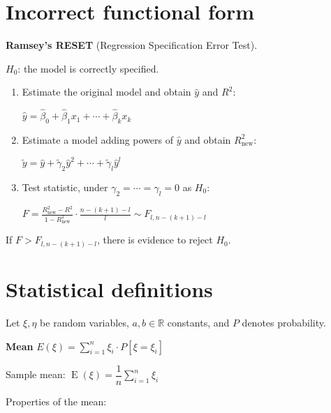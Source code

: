 \documentclass[10pt, a4paper, landscape]{article}
\DeclareMathOperator{\E}{E}
\begin{document}
\begin{multicols}{3}
\columnbreak

\section*{Incorrect functional form}

\textbf{Ramsey's RESET} (Regression Specification Error Test).

\begin{center}
	\( H_{0} \): the model is correctly specified.
\end{center}

\begin{enumerate}[leftmargin=*]
	\item Estimate the original model and obtain \( \hat{y} \) and \( R^{2} \):
	\begin{center}
		\( \hat{y} = \hat{\beta}_{0} + \hat{\beta}_{1} x_{1} + \cdots + \hat{\beta}_{k} x_{k} \)
	\end{center}
	\item Estimate a model adding powers of \( \hat{y} \) and obtain \( R_{\text{new}}^{2} \):
	\begin{center}
		\( \tilde{y} = \hat{y} + \tilde{\gamma}_{2} \hat{y}^{2} + \cdots + \tilde{\gamma}_{l} \hat{y}^{l} \)
	\end{center}
	\item Test statistic, under \( \gamma_{2} = \cdots = \gamma_{l} = 0 \) as \( H_{0} \):
	\begin{center}
		\( F = \frac{R_{\text{new}}^{2} - R^{2}}{1 - R_{\text{new}}^{2}} \cdot \frac{n - (k + 1) - l}{l} \sim F_{l, n - (k + 1) - l} \)
	\end{center}
\end{enumerate}

If \( F > F_{l, n - (k + 1) - l} \), there is evidence to reject \( H_{0} \).

\section*{Statistical definitions}

Let \( \xi, \eta \) be random variables, \( a, b \in \mathbb{R} \) constants, and \( P \) denotes probability.

\textbf{Mean} \quad \( E(\xi) = \sum_{i = 1}^{n} \xi_{i} \cdot P[\xi = \xi_{i}] \)

Sample mean: \quad \( \E(\xi) = \dfrac{1}{n} \sum_{i = 1}^{n} \xi_{i} \)

Properties of the mean:


\end{multicols}
\end{document}
